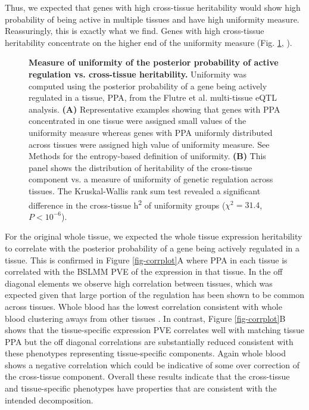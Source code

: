\documentclass[10pt,letterpaper]{article}
\begin{document}
Thus, we expected that genes with high cross-tissue heritability would show high probability of being active in multiple tissues and have high uniformity measure. Reassuringly, this is exactly what we find. Genes with high cross-tissue heritability concentrate on the higher end of the uniformity measure (Fig. \ref{fig-ct-entropy}, ). 

\begin{figure}[H]
\caption{{\bf Measure of uniformity of the posterior probability of active regulation vs. cross-tissue heritability.}
Uniformity was computed using the posterior probability of a gene being actively regulated in a tissue, PPA, from the Flutre et al. \cite{Flutre_2013} multi-tissue eQTL analysis. {\bf (A)} Representative examples showing that genes with PPA concentrated in one tissue were assigned small values of the uniformity measure whereas genes with PPA uniformly distributed across tissues were assigned high value of uniformity measure. See Methods for the entropy-based definition of uniformity. {\bf (B)}  This panel shows the distribution of heritability of the cross-tissue component vs. a measure of uniformity of genetic regulation across tissues. 
The Kruskal-Wallis rank sum test revealed a significant difference in the cross-tissue h\textsuperscript{2} of uniformity groups ($\chi^2 = 31.4$, $P < 10^{-6}$).}
\label{fig-ct-entropy}
\end{figure}


For the original whole tissue, we expected the whole tissue expression heritability to correlate with the posterior probability of a gene being actively regulated in a tissue. This is confirmed in Figure \ref{fig-corrplot}A where PPA in each tissue is correlated with the BSLMM PVE of the expression in that tissue. In the off diagonal elements we observe high correlation between tissues, which was expected given that large portion of the regulation has been shown to be common across tissues. Whole blood has the lowest correlation  consistent with whole blood clustering aways from other tissues \cite{Ardlie_2015}. In contrast, Figure \ref{fig-corrplot}B shows that the tissue-specific expression PVE correlates well with matching tissue PPA but the off diagonal correlations are substantially reduced consistent with these phenotypes representing tissue-specific components. Again whole blood shows a negative correlation which could be indicative of some over correction of the cross-tissue component. Overall these results indicate that the cross-tissue and tissue-specific phenotypes have properties that are consistent with the intended decomposition.
\end{document}
